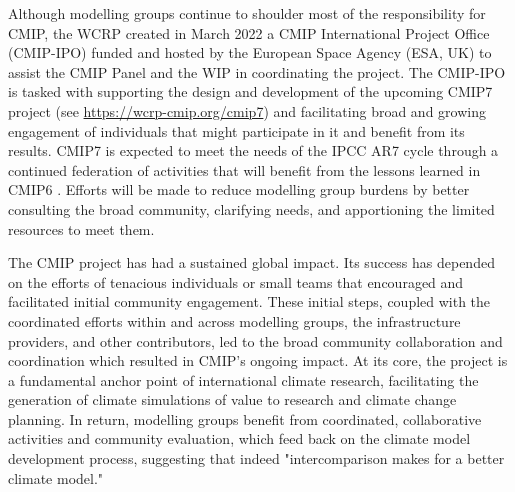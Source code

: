 \documentclass[manuscript]{copernicus}
\begin{document}
Although modelling groups continue to shoulder most of the responsibility for CMIP, the WCRP created in March 2022 a CMIP International Project Office (CMIP-IPO) funded and hosted by the European Space Agency (ESA, UK) to assist the CMIP Panel and the WIP in coordinating the project. The CMIP-IPO is tasked with supporting the design and development of the upcoming CMIP7 project (see \href{https://wcrp-cmip.org/cmip7}{https://wcrp-cmip.org/cmip7}) and facilitating broad and growing engagement of individuals that might participate in it and benefit from its results. CMIP7 is expected to meet the needs of the IPCC AR7 cycle through a continued federation of activities that will benefit from the lessons learned in CMIP6 \citep{eyring_overview_2016}. Efforts will be made to reduce modelling group burdens by better consulting the broad community, clarifying needs, and apportioning the limited resources to meet them. 

The CMIP project has had a sustained global impact. Its success has depended on the efforts of tenacious individuals or small teams that encouraged and facilitated initial community engagement. These initial steps, coupled with the coordinated efforts within and across modelling groups, the infrastructure providers, and other contributors, led to the broad community collaboration and coordination which resulted in CMIP's ongoing impact. At its core, the project is a fundamental anchor point of international climate research, facilitating the generation of climate simulations of value to research and climate change planning. In return, modelling groups benefit from coordinated, collaborative activities and community evaluation, which feed back on the climate model development process, suggesting that indeed "intercomparison makes for a better climate model."





\end{document}
